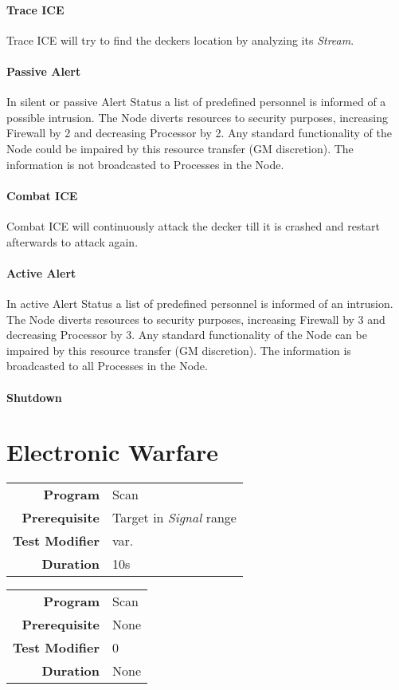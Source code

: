 \paragraph{Trace ICE}

Trace ICE will try to find the deckers location by analyzing its \emph{Stream}.

\paragraph{Passive Alert}
In silent or passive Alert Status a list of predefined personnel is informed
of a possible intrusion. The Node diverts resources to security purposes,
increasing Firewall by 2 and decreasing Processor by 2. Any standard functionality
of the Node could be impaired by this resource transfer (GM discretion).
The information is not broadcasted to Processes in the Node.

\paragraph{Combat ICE} Combat ICE will continuously attack the decker till it
is crashed and restart afterwards to attack again.


\paragraph{Active Alert}

In active Alert Status a list of predefined personnel is informed of an intrusion.
The Node diverts resources to security purposes, increasing Firewall
by 3 and decreasing Processor by 3. Any standard functionality of the Node can
be impaired by this resource transfer (GM discretion).
The information is broadcasted to all Processes in the Node.

\paragraph{Shutdown}

\section{Electronic Warfare}

\label{par:find wireless}


\begin{tabular}{rl}
    \textbf{Program}       & Scan                          \\
    \textbf{Prerequisite}  & Target in \emph{Signal} range \\
    \textbf{Test Modifier} & var.                          \\
    \textbf{Duration}      & 10s                           \\
\end{tabular}

\hfill

\label{par:jam wireless}


\begin{tabular}{rl}
    \textbf{Program}       & Scan \\
    \textbf{Prerequisite}  & None \\
    \textbf{Test Modifier} & 0    \\
    \textbf{Duration}      & None \\
\end{tabular}

\hfill
